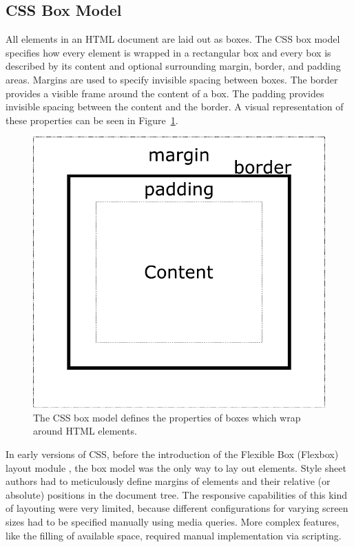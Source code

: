 \subsection{CSS Box Model}
\label{sec:BoxLayout}

All elements in an HTML document are laid out as boxes. The CSS box
model specifies how every element is wrapped in a rectangular box and
every box is described by its content and optional surrounding margin,
border, and padding areas. Margins are used to specify invisible
spacing between boxes. The border provides a visible frame around the
content of a box. The padding provides invisible spacing between the
content and the border. A visual representation of these properties
can be seen in Figure~\ref{fig:BoxModel}.

\begin{figure}[tp]
\centering
\includegraphics[keepaspectratio,width=\linewidth,height=\thirdh]
{diagrams/box-model.pdf}
\caption[CSS Box Model]{
The CSS box model defines the properties of boxes which wrap around HTML elements.
}
\label{fig:BoxModel}
\end{figure}

In early versions of CSS, before the introduction of the Flexible Box
(Flexbox) layout module \parencite{CSSFlexboxFirstDraft}, the box
model was the only way to lay out elements. Style sheet authors had to
meticulously define margins of elements and their relative (or
absolute) positions in the document tree. The responsive capabilities
of this kind of layouting were very limited, because different
configurations for varying screen sizes had to be specified manually
using media queries. More complex features, like the filling of
available space, required manual implementation via scripting.





